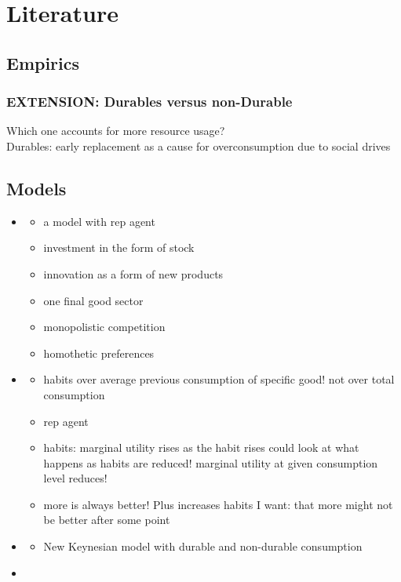 \section{Literature}

\subsection{Empirics}
\subsubsection{EXTENSION: Durables versus non-Durable}
Which one accounts for more resource usage?
\\
Durables: early replacement as a cause for overconsumption due to social drives \citep{Hou2020FeelingsIntentions}

\subsection{Models}
\begin{itemize}
\item \cite{Bilbiie2012EndogenousCycles}
\begin{itemize}
\item a model with rep agent
\item investment in the form of stock 
\item innovation as a form of new products
\item one final good sector
\item monopolistic competition
\item homothetic preferences
\end{itemize}
\item \cite{Ravn2006DeepHabits}
\begin{itemize}
 \item habits over average previous consumption of specific good! not over total consumption
 \item rep agent 
 \item habits: marginal utility rises as the habit rises \ar could look at what happens as habits are reduced! \ar marginal utility at given consumption level reduces!
 \item more is always better! Plus increases habits \ar I want: that more might not be better after some point
\end{itemize}
\item \cite{McKay2021LumpyPolicy}
\begin{itemize}
\item New Keynesian model with durable and non-durable consumption 
\end{itemize}
\item \cite{Acemoglu2012TheChange}
\end{itemize}


